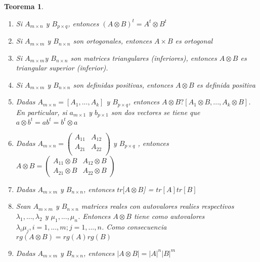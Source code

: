 \documentclass{article}
\theoremstyle{theorem-style}  %
\newtheorem{theorem}{Teorema}[section]  %
\theoremstyle{definition-style}
\theoremstyle{example-style}
\theoremstyle{exercise-style}
\begin{document}
\begin{theorem}
\begin{enumerate}
			\item \textit{Si $A_{m \times n}$ y $B_{p \times q}$, entonces $(A \otimes B)^t = A^t \otimes B^t$}
			
			\item \textit{Si $A_{m \times m}$ y $B_{n \times n}$ son ortogonales, entonces $A \times B$ es ortogonal}
			
			\item \textit{Si $A_{m \times m} $y $B_{n \times n}$ son matrices triangulares (inferiores), entonces $A \otimes B$ es triangular superior (inferior).}
			
			\item \textit{Si $A_{m \times m}$ y $B_{n \times n}$ son definidas positivas, entonces $A \otimes B$ es definida positiva}
			
			\item \textit{Dadas $A_{m \times n} = [A_1, ..., A_k]$ y $B_{p \times q}$, entonces $A \otimes B ? [A_1 \otimes B, ..., A_k \otimes B]$. En particular, si $a_{m \times 1}$ y $b_{p \times 1}$ son dos vectores se tiene que $a \otimes b^t = ab^t = b^t \otimes a$ }
			
			\item \textit{Dadas $A_{m \times n} =\left( {\begin{array}{cc}
					A_{11} & A_{12}\\
					A_{21} & A_{22}\\
					\end{array}}\right)$ 			 y $B_{p \times q}$ , entonces $A \otimes B = \left( {\begin{array}{cc}
					A_{11} \otimes B & A_{12} \otimes B\\
					A_{21}  \otimes B & A_{22} \otimes B
					\end{array}}\right)  $}
			
			\item \textit{Dadas $A_{m \times m}$ y $B_{n \times n}$, entonces $tr[A \otimes B$] = $tr[A]tr[B]$}
			
			\item \textit{Sean $A_{m \times m}$ y $B_{n \times n}$ matrices reales con autovalores realies respectivos $\lambda_1, ..., \lambda_2$ y $\mu_1, ..., \mu_n$. Entonces $A \otimes B$ tiene como autovalores $\lambda_i \mu_j, i = 1, ..., m; j = 1,...,n$. Como consecuencia $rg(A \otimes B) = rg(A)rg(B)$}
			
			\item \textit{Dadas $A_{m \times m }$ y $B_{n \times n}$, entonces $|A \otimes B| = |A|^n |B|^m$}
			
			
		\end{enumerate}
	\end{theorem}
	
\end{document}
